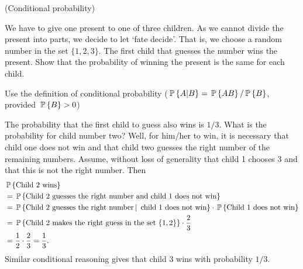 \begin{question}(Conditional probability)

  We have to give one present to one of three children. As we cannot
  divide the present into parts, we decide to let `fate decide'. That
  is, we choose a random number in the set $\{1, 2, 3\}$. The first
  child that guesses the number wins the present. Show that the
  probability of winning the present is the same for each child.
\begin{solution}
    Use the definition of conditional probability
    ($\P{A|B} = \P{AB}/\P{B}$, provided $\P{B}>0$)

    The probability that the first child to guess also wins is
    $1/3$. What is the probability for child number two? Well, for
    him/her to win, it is necessary that child one does not win and
    that child two guesses the right number of the remaining
    numbers. Assume, without loss of generality that child 1 chooses
    $3$ and that this is not the right number. Then 
    \begin{equation*}
      \begin{split}
&\P{\text{Child  2 wins}} \\
&= \P{\text{Child 2 guesses the right number and child 1 does not win}} \\
&= \P{\text{Child 2 guesses the right number} \given \text{ child 1 does not win}}
\cdot \P{\text{Child 1 does not win}} \\
&= \P{\text{Child 2 makes the right guess in the set $\{1,2\}$}}\cdot \frac 23 \\
&= \frac 1 2\cdot \frac 23  = \frac 1 3.
      \end{split}
    \end{equation*}
    Similar conditional reasoning gives that child 3 wins with probability $1/3$. 
  \end{solution}
\end{question}

